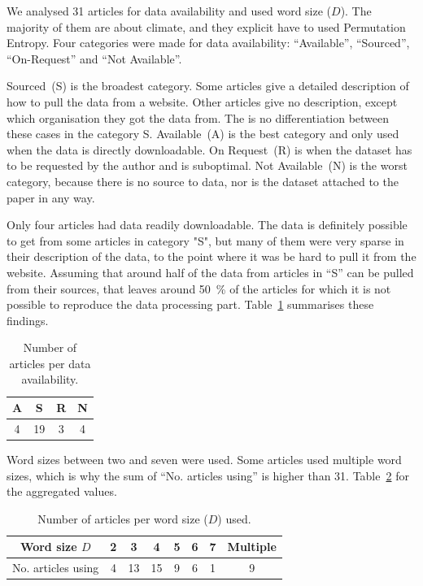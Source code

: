 We analysed \num{31} articles for data availability and used word size ($D$). 
The majority of them are about climate, and they explicit have to used Permutation Entropy. Four categories were made for data availability: “Available”, “Sourced”, “On-Request” and “Not Available”. 

Sourced~(S) is the broadest category. 
Some articles give a detailed description of how to pull the data from a website. 
Other articles give no description, except which organisation they got the data from. 
The is no differentiation between these cases in the category S. 
Available~(A) is the best category and only used when the data is directly downloadable. 
On Request~(R) is when the dataset has to be requested by the author and is suboptimal. 
Not Available~(N) is the worst category, because there is no source to data, nor is the dataset attached to the paper in any way. 

Only four articles had data readily downloadable. 
The data is definitely possible to get from some articles in category "S", but many of them were very sparse in their description of the data, to the point where it was be hard to pull it from the website. 
Assuming that around half of the data from articles in ``S'' can be pulled from their sources, that leaves around \SI{50}{\percent} of the articles for which it is not possible to reproduce the data processing part. 
Table~\ref{tab:ArticlesPerData} summarises these findings.

\begin{table}[hbt]
	\centering
	\begin{tabular}{*4{c}}
		\toprule
		A & S  & R & N \\ \midrule
		4 & 19 & 3 & 4 \\ \bottomrule
	\end{tabular}
	\caption{Number of articles per data availability.}\label{tab:ArticlesPerData}
\end{table}

Word sizes between two and seven were used. 
Some articles used multiple word sizes, which is why the sum of ``No. articles using'' is higher than \num{31}.
Table~\ref{tab:ArticlesPerD} for the aggregated values.

\begin{table}[hbt]
\centering
\begin{tabular}{*8{c}}
\toprule
Word size $D$ & 2 & 3  & 4  & 5 & 6 & 7 & Multiple \\ \midrule
No. articles using  & 4 & 13 & 15 & 9 & 6 & 1 & 9        \\ \bottomrule
\end{tabular}
\caption{Number of articles per word size ($D$) used.}\label{tab:ArticlesPerD}
\end{table}


